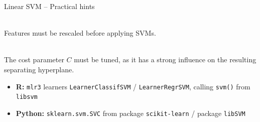 
\begin{frame}{Linear SVM -- Practical hints}

\footnotesize

   \\
  Features must be rescaled before applying SVMs.
  
  \medskip
  
   \\
  The cost parameter $C$ must be tuned, as it has a strong influence on the resulting separating hyperplane. 

  \medskip

  \begin{itemize}
    \item \textbf{R:} \texttt{mlr3} learners \texttt{LearnerClassifSVM} / 
    \texttt{LearnerRegrSVM}, calling \texttt{svm()} from \texttt{libsvm}
    \item \textbf{Python:} \texttt{sklearn.svm.SVC} from package \texttt{scikit-learn} / package \texttt{libSVM}
  \end{itemize}

\end{frame}
